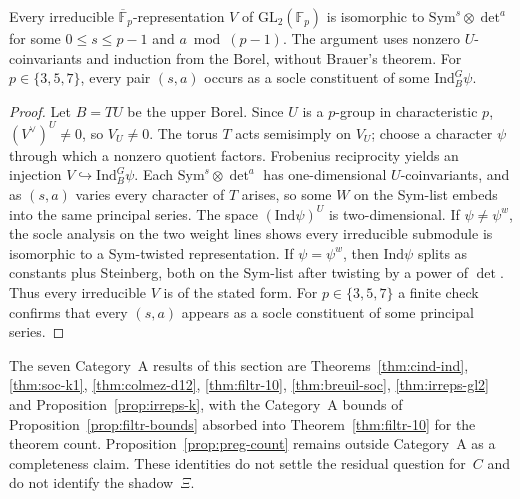 \begin{theorem}\label{thm:irreps-gl2}
Every irreducible $\overline{\mathbb{F}}_p$-representation $V$ of $\mathrm{GL}_2(\mathbb{F}_p)$ is isomorphic to $\mathrm{Sym}^s\otimes\det^a$ for some $0\le s\le p-1$ and $a\bmod(p-1)$. The argument uses nonzero $U$-coinvariants and induction from the Borel, without Brauer's theorem. For $p\in\{3,5,7\}$, every pair $(s,a)$ occurs as a socle constituent of some $\mathrm{Ind}_B^G\psi$.
\end{theorem}
\begin{proof}
Let $B=TU$ be the upper Borel. Since $U$ is a $p$-group in characteristic $p$, $(V^\vee)^U\neq0$, so $V_U\neq0$. The torus $T$ acts semisimply on $V_U$; choose a character $\psi$ through which a nonzero quotient factors. Frobenius reciprocity yields an injection $V\hookrightarrow\mathrm{Ind}_B^G\psi$. Each $\mathrm{Sym}^s\otimes\det^a$ has one-dimensional $U$-coinvariants, and as $(s,a)$ varies every character of $T$ arises, so some $W$ on the Sym-list embeds into the same principal series. The space $(\mathrm{Ind}\psi)^U$ is two-dimensional. If $\psi\neq\psi^w$, the socle analysis on the two weight lines shows every irreducible submodule is isomorphic to a Sym-twisted representation. If $\psi=\psi^w$, then $\mathrm{Ind}\psi$ splits as constants plus Steinberg, both on the Sym-list after twisting by a power of $\det$. Thus every irreducible $V$ is of the stated form. For $p\in\{3,5,7\}$ a finite check confirms that every $(s,a)$ appears as a socle constituent of some principal series.
\end{proof}

\begin{remark}
The seven Category~A results of this section are Theorems~\ref{thm:cind-ind}, \ref{thm:soc-k1}, \ref{thm:colmez-d12}, \ref{thm:filtr-10}, \ref{thm:breuil-soc}, \ref{thm:irreps-gl2} and Proposition~\ref{prop:irreps-k}, with the Category~A bounds of Proposition~\ref{prop:filtr-bounds} absorbed into Theorem~\ref{thm:filtr-10} for the theorem count. Proposition~\ref{prop:preg-count} remains outside Category~A as a completeness claim. These identities do not settle the residual question for~$C$ and do not identify the shadow~$\Xi$.
\end{remark}
